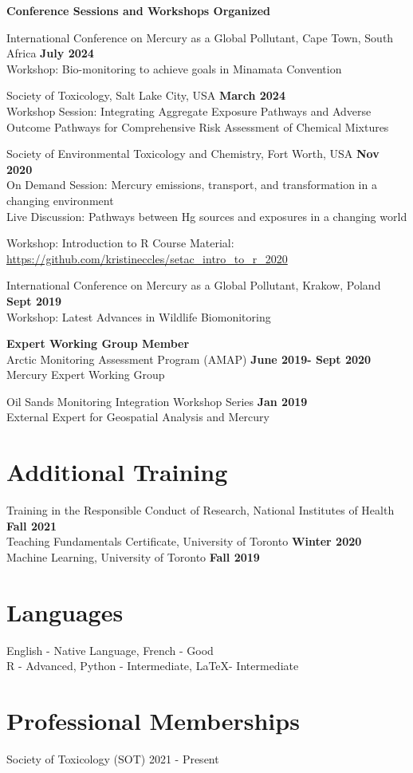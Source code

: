 \documentclass[margin,line]{res}
\begin{document}
\begin{resume}
{\bf Conference Sessions and Workshops Organized}

International Conference on Mercury as a Global Pollutant, Cape Town, South Africa \hfill {\bf July 2024}\\
Workshop: Bio-monitoring to achieve goals in Minamata Convention

Society of Toxicology, Salt Lake City, USA \hfill {\bf  March 2024}\\
Workshop Session: Integrating Aggregate Exposure Pathways and Adverse Outcome Pathways for Comprehensive Risk Assessment of Chemical Mixtures

Society of Environmental Toxicology and Chemistry, Fort Worth, USA \hfill {\bf  Nov 2020}\\
On Demand Session: Mercury emissions, transport, and transformation in a changing environment\\
Live Discussion: Pathways between Hg sources and exposures in a changing world

Workshop: Introduction to R
Course Material: \url{https://github.com/kristineccles/setac_intro_to_r_2020}

International Conference on Mercury as a Global Pollutant, Krakow, Poland \hfill {\bf Sept 2019}\\
Workshop: Latest Advances in Wildlife Biomonitoring

{\bf Expert Working Group Member}\\
Arctic Monitoring Assessment Program (AMAP)
\hfill {\bf  June 2019- Sept 2020}\\
Mercury Expert Working Group

Oil Sands Monitoring Integration Workshop Series
\hfill {\bf  Jan 2019}\\
External Expert for Geospatial Analysis and Mercury

\vspace*{.1in}

\section{\sc Additional Training}
Training in the Responsible Conduct of Research, National Institutes of Health \hfill {\bf  Fall 2021}\\
Teaching Fundamentals Certificate, University of Toronto
\hfill {\bf  Winter 2020}\\
Machine Learning, University of Toronto
\hfill {\bf  Fall 2019}

\vspace*{.1in}

\section{\sc Languages}

English - Native Language, French - Good\\
R - Advanced, Python - Intermediate, LaTeX- Intermediate

\vspace*{.1in}

\section{\sc Professional Memberships}
Society of Toxicology (SOT) 2021 - Present

\end{resume}
\end{document}
